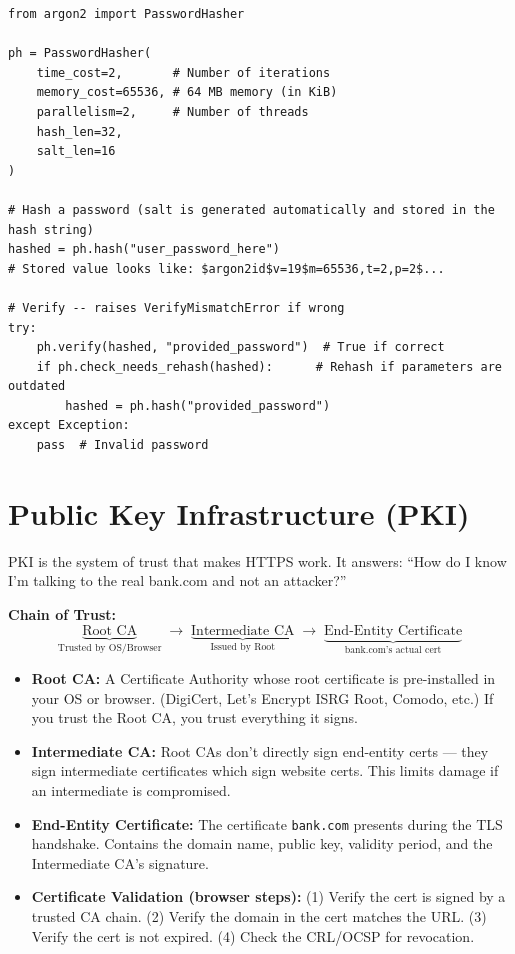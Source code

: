 \documentclass[11pt, letterpaper]{article}
\begin{document}
\begin{lstlisting}[style=safe, caption={Python: correct password hashing with argon2-cffi}]
from argon2 import PasswordHasher

ph = PasswordHasher(
    time_cost=2,       # Number of iterations
    memory_cost=65536, # 64 MB memory (in KiB)
    parallelism=2,     # Number of threads
    hash_len=32,
    salt_len=16
)

# Hash a password (salt is generated automatically and stored in the hash string)
hashed = ph.hash("user_password_here")
# Stored value looks like: $argon2id$v=19$m=65536,t=2,p=2$...

# Verify -- raises VerifyMismatchError if wrong
try:
    ph.verify(hashed, "provided_password")  # True if correct
    if ph.check_needs_rehash(hashed):      # Rehash if parameters are outdated
        hashed = ph.hash("provided_password")
except Exception:
    pass  # Invalid password
\end{lstlisting}

\section*{Public Key Infrastructure (PKI)}

PKI is the system of trust that makes HTTPS work. It answers: ``How do I know I'm talking to the real bank.com and not an attacker?''

\textbf{Chain of Trust:}
\[
  \underbrace{\text{Root CA}}_{\text{Trusted by OS/Browser}} \;\longrightarrow\;
  \underbrace{\text{Intermediate CA}}_{\text{Issued by Root}} \;\longrightarrow\;
  \underbrace{\text{End-Entity Certificate}}_{\text{bank.com's actual cert}}
\]

\begin{itemize}[noitemsep]
  \item \textbf{Root CA:} A Certificate Authority whose root certificate is pre-installed in your OS or browser. (DigiCert, Let's Encrypt ISRG Root, Comodo, etc.) If you trust the Root CA, you trust everything it signs.
  \item \textbf{Intermediate CA:} Root CAs don't directly sign end-entity certs --- they sign intermediate certificates which sign website certs. This limits damage if an intermediate is compromised.
  \item \textbf{End-Entity Certificate:} The certificate \texttt{bank.com} presents during the TLS handshake. Contains the domain name, public key, validity period, and the Intermediate CA's signature.
  \item \textbf{Certificate Validation (browser steps):} (1) Verify the cert is signed by a trusted CA chain. (2) Verify the domain in the cert matches the URL. (3) Verify the cert is not expired. (4) Check the CRL/OCSP for revocation.
\end{itemize}
\end{document}
